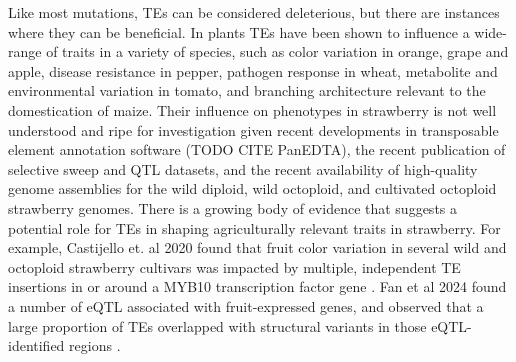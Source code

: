 \documentclass[fleqn,10pt]{olplainarticle}
\begin{document}
Like most mutations, TEs can be considered deleterious, but there are instances where they can be beneficial.
In plants TEs have been shown to influence a wide-range of traits in a variety of species, such as color variation in orange, grape and apple, disease resistance in pepper, pathogen response in wheat, metabolite and environmental variation in tomato, and branching architecture relevant to the domestication of maize.
Their influence on phenotypes in strawberry is not well understood and ripe for investigation given recent developments in transposable element annotation software \cite{Ou2019} (TODO CITE PanEDTA), the recent publication of selective sweep and QTL datasets, and the recent availability of high-quality genome assemblies for the wild diploid, wild octoploid, and cultivated octoploid strawberry genomes. 
There is a growing body of evidence that suggests a potential role for TEs in shaping agriculturally relevant traits in strawberry.
For example, Castijello et. al 2020 found that fruit color variation in several wild and octoploid strawberry cultivars was impacted by multiple, independent TE insertions in or around a MYB10 transcription factor gene \cite{Castillejo2020}.
Fan et al 2024 found a number of eQTL associated with fruit-expressed genes, and observed that a large proportion of TEs overlapped with structural variants in those eQTL-identified regions \cite{Fan2022}.\\
\end{document}
